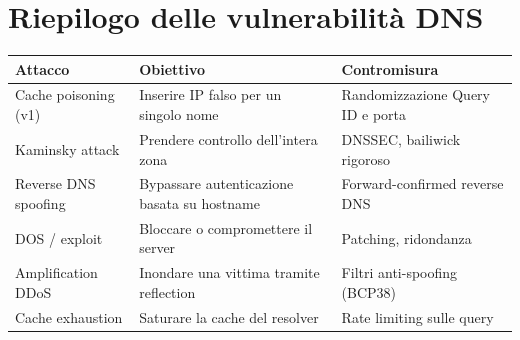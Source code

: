 \documentclass{article}
\begin{document}
\section*{Riepilogo delle vulnerabilità DNS}

\begin{center}
\renewcommand{\arraystretch}{1.5}
\begin{tabular}{p{3.5cm} p{5cm} p{5cm}}
\hline
\textbf{Attacco} & \textbf{Obiettivo} & \textbf{Contromisura} \\
\hline
Cache poisoning (v1) & Inserire IP falso per un singolo nome & Randomizzazione Query ID e porta \\
Kaminsky attack & Prendere controllo dell'intera zona & DNSSEC, bailiwick rigoroso \\
Reverse DNS spoofing & Bypassare autenticazione basata su hostname & Forward-confirmed reverse DNS \\
DOS / exploit & Bloccare o compromettere il server & Patching, ridondanza \\
Amplification DDoS & Inondare una vittima tramite reflection & Filtri anti-spoofing (BCP38) \\
Cache exhaustion & Saturare la cache del resolver & Rate limiting sulle query \\
\hline
\end{tabular}
\end{center}
\end{document}

